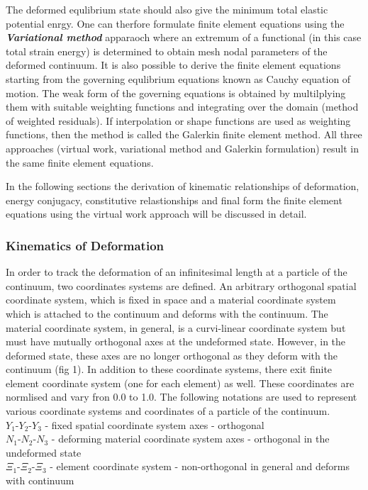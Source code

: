 The deformed equlibrium state should also give the minimum total elastic potential enrgy. One can therfore formulate finite element equations 
using the \textit{\textbf{Variational method}} apparaoch where an extremum of a functional (in this case total strain energy) is determined to 
obtain mesh nodal parameters of the deformed continuum. It is also possible to derive the finite element equations starting from the governing
equlibrium equations known as Cauchy equation of motion. The weak form of the governing equations is obtained by multilplying them with suitable
weighting functions and integrating over the domain (method of weighted residuals). If interpolation or shape functions are used as weighting 
functions, then the method is called the Galerkin finite element method. All three approaches (virtual work, variational method and 
Galerkin formulation) result in the same finite element equations.     

In the following sections the derivation of kinematic relationships of deformation, energy conjugacy, constitutive relastionships and final form 
the finite element equations using the virtual work approach will be discussed in detail.

\subsubsection{Kinematics of Deformation}
In order to track the deformation of an infinitesimal length at a particle of the continuum, two coordinates systems are defined. An arbitrary
orthogonal spatial coordinate system, which is fixed in space and a material coordinate system which is attached to the continuum and deforms 
with the continuum. The material coordinate system, in general, is a curvi-linear coordinate system but must have mutually orthogonal axes at the
undeformed state. However, in the deformed state, these axes are no longer orthogonal as they deform with the continuum (fig 1). In addition
to these coordinate systems, there exit finite element coordinate system (one for each element) as well. These coordinates are normlised and 
vary fron 0.0 to 1.0. The following notations are used to represent various coordinate systems and coordinates of a particle of the continuum.\\

\noindent $Y_{1}$-$Y_{2}$-$Y_{3}$ - fixed spatial coordinate system axes - orthogonal\\
$N_{1}$-$N_{2}$-$N_{3}$ - deforming material coordinate system axes  - orthogonal in the undeformed state\\
$\Xi_{1}$-$\Xi_{2}$-$\Xi_{3}$ - element coordinate system - non-orthogonal in general and deforms with continuum\\

